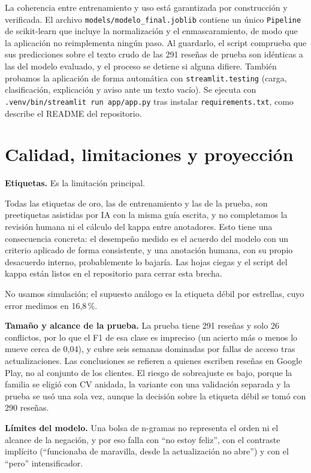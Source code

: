 \documentclass[11pt,a4paper]{article}
\newif\ifkappa
\newcommand{\pend}[1]{\textcolor{dorado}{\textbf{[#1]}}}
\begin{document}
La coherencia entre entrenamiento y uso está garantizada por construcción y verificada. El archivo
\texttt{models/modelo\_final.joblib} contiene un único \texttt{Pipeline} de scikit-learn \cite{sklearn} que incluye la
normalización y el enmascaramiento, de modo que la aplicación no reimplementa ningún paso. Al
guardarlo, el script comprueba que sus predicciones sobre el texto crudo de las 291 reseñas de
prueba son idénticas a las del modelo evaluado, y el proceso se detiene si alguna difiere. También
probamos la aplicación de forma automática con \texttt{streamlit.testing} (carga, clasificación,
explicación y aviso ante un texto vacío). Se ejecuta con
\texttt{.venv/bin/streamlit run app/app.py} tras instalar \texttt{requirements.txt}, como describe
el README del repositorio.

\section{Calidad, limitaciones y proyección}
\textbf{Etiquetas.} Es la limitación principal.
\ifkappa
\pend{completar con el kappa real de las hojas ciegas}
\else
Todas las etiquetas de oro, las de entrenamiento y las de la prueba, son preetiquetas asistidas por
IA con la misma guía escrita, y no completamos la revisión humana ni el cálculo del kappa entre
anotadores. Esto tiene una consecuencia concreta: el desempeño medido es el acuerdo del modelo con
un criterio aplicado de forma consistente, y una anotación humana, con su propio desacuerdo
interno, probablemente lo bajaría. Las hojas ciegas y el script del kappa están listos en el
repositorio para cerrar esta brecha.
\fi
No usamos simulación; el supuesto análogo es la etiqueta débil por estrellas, cuyo error medimos en
16,8\,\%.

\textbf{Tamaño y alcance de la prueba.} La prueba tiene 291 reseñas y solo 26 conflictos, por lo que
el F1 de esa clase es impreciso (un acierto más o menos lo mueve cerca de 0,04), y cubre seis semanas
dominadas por fallas de acceso tras actualizaciones. Las conclusiones se refieren a quienes escriben
reseñas en Google Play, no al conjunto de los clientes. El riesgo de sobreajuste es bajo, porque la
familia se eligió con CV anidada, la variante con una validación separada y la prueba se usó una
sola vez, aunque la decisión sobre la etiqueta débil se tomó con 290 reseñas.

\textbf{Límites del modelo.} Una bolsa de n-gramas no representa el orden ni el alcance de la
negación, y por eso falla con ``no estoy feliz'', con el contraste implícito (``funcionaba de
maravilla, desde la actualización no abre'') y con el ``pero'' intensificador.
\end{document}
